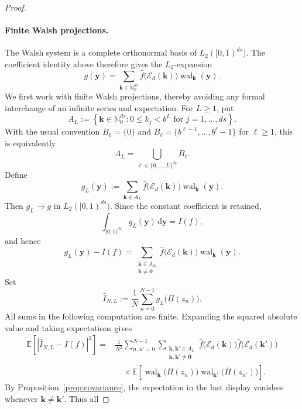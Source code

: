 \documentclass[11pt]{article}
\newcommand{\Nzero}{\mathbb N_0}
\newcommand{\E}{\mathcal E}
\newcommand{\wal}{\operatorname{wal}}
\begin{document}
\begin{proof}
\paragraph{Finite Walsh projections.}
The Walsh system is a complete orthonormal basis of
\(L_2([0,1)^{ds})\).  The coefficient identity above therefore gives the
\(L_2\)-expansion
\[
  g(\boldsymbol y)
  =\sum_{\boldsymbol k\in\Nzero^{ds}}
     \widehat f\bigl(\E_d(\boldsymbol k)\bigr)
     \wal_{\boldsymbol k}(\boldsymbol y).
\]
We first work with finite Walsh projections, thereby avoiding any formal
interchange of an infinite series and expectation.  For \(L\geq1\), put
\[
  A_L
  :=\left\{
      \boldsymbol k\in\Nzero^{ds}:
      0\leq k_j<b^L \text{ for }j=1,\ldots,ds
    \right\}.
\]
With the usual convention
\(B_0=\{0\}\) and
\(B_\ell=\{b^{\ell-1},\ldots,b^\ell-1\}\) for \(\ell\geq1\), this is
equivalently
\[
  A_L
  =\bigcup_{\boldsymbol\ell\in\{0,\ldots,L\}^{ds}}
     B_{\boldsymbol\ell}.
\]
Define
\[
  g_L(\boldsymbol y)
  :=\sum_{\boldsymbol k\in A_L}
      \widehat f\bigl(\E_d(\boldsymbol k)\bigr)
      \wal_{\boldsymbol k}(\boldsymbol y).
\]
Then \(g_L\to g\) in \(L_2([0,1)^{ds})\).  Since the constant
coefficient is retained,
\[
  \int_{[0,1)^{ds}}g_L(\boldsymbol y)\,\mathrm d\boldsymbol y=I(f),
\]
and hence
\[
  g_L(\boldsymbol y)-I(f)
  =\sum_{\substack{\boldsymbol k\in A_L\\
                    \boldsymbol k\neq\boldsymbol0}}
      \widehat f\bigl(\E_d(\boldsymbol k)\bigr)
      \wal_{\boldsymbol k}(\boldsymbol y).
\]
Set
\[
  \widehat I_{N,L}
  :=\frac1N\sum_{n=0}^{N-1}g_L\bigl(\Pi(z_n)\bigr).
\]
All sums in the following computation are finite.  Expanding the squared
absolute value and taking expectations gives
\[
\begin{aligned}
  \mathbb E\!\left[
    \left|\widehat I_{N,L}-I(f)\right|^2
  \right]
  ={}&\frac1{N^2}\sum_{n,n'=0}^{N-1}
      \sum_{\substack{\boldsymbol k,\boldsymbol k'\in A_L\\
                       \boldsymbol k,\boldsymbol k'\neq\boldsymbol0}}
      \widehat f\bigl(\E_d(\boldsymbol k)\bigr)
      \overline{
        \widehat f\bigl(\E_d(\boldsymbol k')\bigr)
      } \\
  &\quad\times
      \mathbb E\!\left[
        \wal_{\boldsymbol k}\bigl(\Pi(z_n)\bigr)
        \overline{
          \wal_{\boldsymbol k'}\bigl(\Pi(z_{n'})\bigr)
        }
      \right].
\end{aligned}
\]
By Proposition~\ref{prop:covariance}, the expectation in the last display
vanishes whenever \(\boldsymbol k\neq\boldsymbol k'\).  Thus all

\end{proof}
\end{document}
